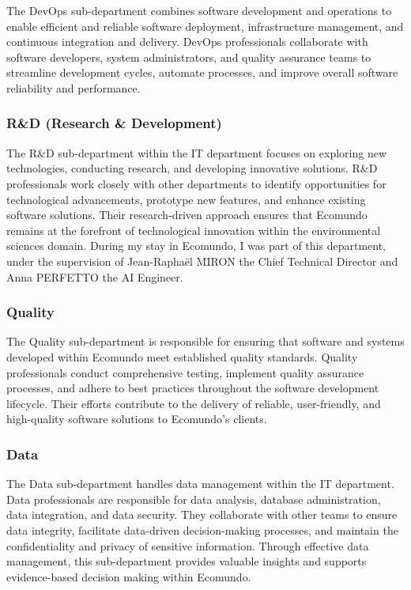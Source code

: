 \documentclass[a4paper,12pt,twoside]{report}
\begin{document}
The DevOps sub-department combines software development and operations to enable efficient and reliable software deployment, infrastructure management, and continuous integration and delivery. DevOps professionals collaborate with software developers, system administrators, and quality assurance teams to streamline development cycles, automate processes, and improve overall software reliability and performance.

\subsubsection{R\&D (Research \& Development)}

The R\&D sub-department within the IT department focuses on exploring new technologies, conducting research, and developing innovative solutions. R\&D professionals work closely with other departments to identify opportunities for technological advancements, prototype new features, and enhance existing software solutions. Their research-driven approach ensures that Ecomundo remains at the forefront of technological innovation within the environmental sciences domain.
During my stay in Ecomundo, I was part of this department, under the supervision of Jean-Raphaël MIRON the Chief Technical Director and Anna PERFETTO the AI Engineer.

\subsubsection{Quality}

The Quality sub-department is responsible for ensuring that software and systems developed within Ecomundo meet established quality standards. Quality professionals conduct comprehensive testing, implement quality assurance processes, and adhere to best practices throughout the software development lifecycle. Their efforts contribute to the delivery of reliable, user-friendly, and high-quality software solutions to Ecomundo's clients.

\subsubsection{Data}

The Data sub-department handles data management within the IT department. Data professionals are responsible for data analysis, database administration, data integration, and data security. They collaborate with other teams to ensure data integrity, facilitate data-driven decision-making processes, and maintain the confidentiality and privacy of sensitive information. Through effective data management, this sub-department provides valuable insights and supports evidence-based decision making within Ecomundo.
\end{document}

